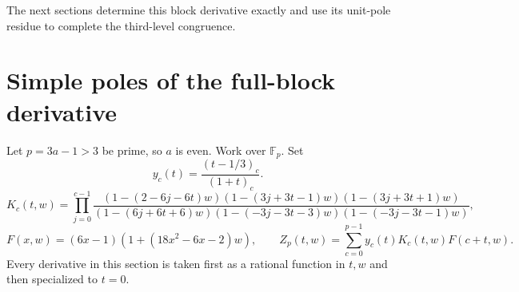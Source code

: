 \documentclass[11pt,letterpaper]{article}
\numberwithin{equation}{section}
\begin{document}
The next sections determine this block derivative exactly and use its
unit-pole residue to complete the third-level congruence.

\section{Simple poles of the full-block derivative}\label{loc-VIII-21}
\label{VIII-sec:E8-simple-poles}
Let $p=3a-1>3$ be prime, so $a$ is even. Work over $\mathbb F_p$.
Set
\[
 y_c(t)=\frac{(t-1/3)_c}{(1+t)_c}.
\]
\[
 K_c(t,w)=\prod_{j=0}^{c-1}
 \frac{(1-(2-6j-6t)w)(1-(3j+3t-1)w)(1-(3j+3t+1)w)}
 {(1-(6j+6t+6)w)(1-(-3j-3t-3)w)(1-(-3j-3t-1)w)},
\]
\[
 F(x,w)=(6x-1)(1+(18x^2-6x-2)w),\qquad
 Z_p(t,w)=\sum_{c=0}^{p-1}y_c(t)K_c(t,w)F(c+t,w).
\]
Every derivative in this section is taken first as a rational function
in $t,w$ and then specialized to $t=0$.
\end{document}
